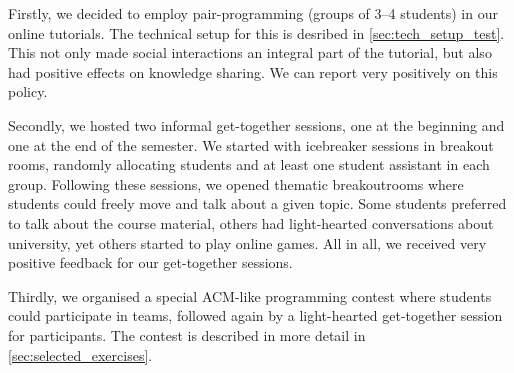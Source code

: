 Firstly, we decided to employ pair-programming (groups of 3--4 students)
in our online tutorials.
The technical setup for this is desribed in \cref{sec:tech_setup_test}.
This not only made social interactions an integral part of the tutorial,
but also had positive effects on knowledge sharing.
We can report very positively on this policy.

Secondly, we hosted two informal get-together sessions,
one at the beginning and one at the end of the semester.
We started with icebreaker sessions in breakout rooms,
randomly allocating students and at least one student assistant in each group.
Following these sessions,
we opened thematic breakoutrooms where students
could freely move and talk about a given topic.
Some students preferred to talk about the course material, others had
light-hearted conversations about university, yet others started to play online games.
All in all, we received very positive feedback for our get-together sessions.

Thirdly, we organised a special
ACM-like programming contest
where students could participate in teams,
followed again by a light-hearted get-together session
for participants.
The contest is described in more detail in \cref{sec:selected_exercises}.
